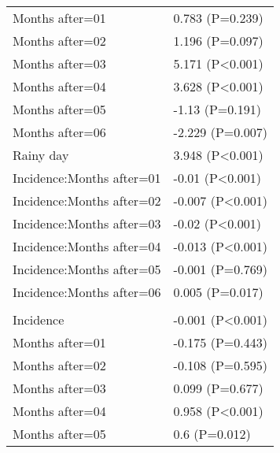\documentclass[]{article}
\begin{document}
\begin{longtable}[t]{ll}
\hspace{1em}Months after=01 & 0.783 (P=0.239)\\
\hspace{1em}Months after=02 & 1.196 (P=0.097)\\
\hspace{1em}Months after=03 & 5.171 (P<0.001)\\
\hspace{1em}Months after=04 & 3.628 (P<0.001)\\
\hspace{1em}Months after=05 & -1.13 (P=0.191)\\
\hspace{1em}Months after=06 & -2.229 (P=0.007)\\
\hspace{1em}Rainy day & 3.948 (P<0.001)\\
\hspace{1em}Incidence:Months after=01 & -0.01 (P<0.001)\\
\hspace{1em}Incidence:Months after=02 & -0.007 (P<0.001)\\
\hspace{1em}Incidence:Months after=03 & -0.02 (P<0.001)\\
\hspace{1em}Incidence:Months after=04 & -0.013 (P<0.001)\\
\hspace{1em}Incidence:Months after=05 & -0.001 (P=0.769)\\
\hspace{1em}Incidence:Months after=06 & 0.005 (P=0.017)\\
\addlinespace[1.5em]
\multicolumn{2}{l}{\textbf{Temporary field worker}}\\
\hspace{1em}Incidence & -0.001 (P<0.001)\\
\hspace{1em}Months after=01 & -0.175 (P=0.443)\\
\hspace{1em}Months after=02 & -0.108 (P=0.595)\\
\hspace{1em}Months after=03 & 0.099 (P=0.677)\\
\hspace{1em}Months after=04 & 0.958 (P<0.001)\\
\hspace{1em}Months after=05 & 0.6 (P=0.012)\\

\end{longtable}
\end{document}
